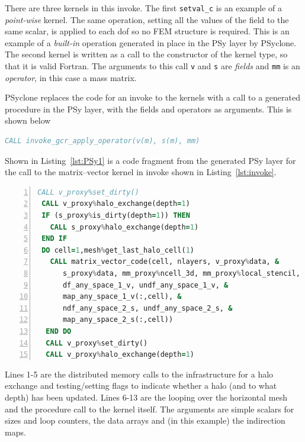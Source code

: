 \documentclass[review,times]{elsarticle}
\begin{document}
There are three kernels in this invoke. The first \verb+setval_c+ is
an example of a {\em point-wise} kernel. The same operation, setting all
the values of the field to the same scalar, is applied to each dof so no 
FEM structure is required. This is an example of a {\em built-in} operation 
generated in place in the PSy layer by PSyclone. The second
kernel is written as a call to the constructor of the kernel type, so that it is
valid Fortran. The arguments to this call \verb+v+ and \verb+s+ are
{\em fields} and \verb+mm+ is an {\em operator}, in this case a mass
matrix.

PSyclone replaces the code for an invoke to the kernels with a call to a
generated procedure in the PSy layer, with the fields and operators as
arguments. This is shown below
\begin{lstlisting}[language=Fortran,caption={Code fragment showing the
generated Algorithm layer code},label={lst:invoke_56}]
 CALL invoke_gcr_apply_operator(v(m), s(m), mm)
\end{lstlisting}

Shown in Listing~\ref{lst:PSy1} is a code fragment from the generated PSy layer for
the call to the matrix--vector kernel in invoke shown in Listing~\ref{lst:invoke}.

\begin{lstlisting}[language=Fortran, numbers=left,caption={Code 
fragment of the generated PSy layer},label={lst:PSy1}]
 CALL v_proxy%set_dirty()
 CALL v_proxy%halo_exchange(depth=1)
 IF (s_proxy%is_dirty(depth=1)) THEN
   CALL s_proxy%halo_exchange(depth=1)
 END IF 
 DO cell=1,mesh%get_last_halo_cell(1)
   CALL matrix_vector_code(cell, nlayers, v_proxy%data, &
      s_proxy%data, mm_proxy%ncell_3d, mm_proxy%local_stencil, &
      df_any_space_1_v, undf_any_space_1_v, &
      map_any_space_1_v(:,cell), &
      ndf_any_space_2_s, undf_any_space_2_s, &
      map_any_space_2_s(:,cell))
  END DO 
  CALL v_proxy%set_dirty()
  CALL v_proxy%halo_exchange(depth=1)
\end{lstlisting}
Lines 1-5 are the distributed
memory calls to the infrastructure for a halo exchange and
testing/setting flags to indicate whether a halo (and to what depth)
has been updated. Lines 6-13 are the looping over the horizontal mesh
and the procedure call to the kernel itself. The arguments are simple
scalars for sizes and loop counters, the data arrays and (in this example)
the indirection maps. 
\end{document}
